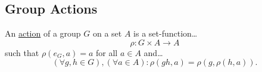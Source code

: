 \subsection{Group Actions}\label{groupactions}

An \hyperref[categoricalgroupaction]{action} of a group $G$ on a set $A$ is a set-function\dots
$$\rho : G \times A \rightarrow A$$
such that $\rho (e_G, a) = a$ for all $a \in A$ and\dots
$$(\forall g,h \in G), (\forall a \in A) : \rho(gh,a) = \rho(g, \rho(h,a)).$$
